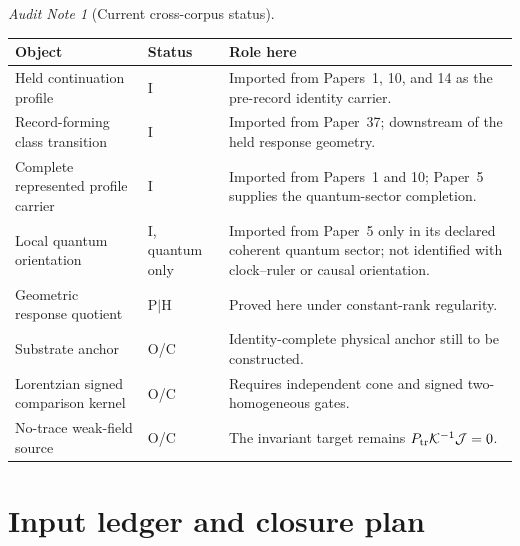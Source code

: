 \documentclass[11pt]{article}
\theoremstyle{remark}
\newtheorem{audit}[theorem]{Audit Note}
\newcommand{\Ptr}{P_{\rm tr}}
\begin{document}
\begin{audit}[Current cross-corpus status]
\begin{longtable}{p{}p{}p{}}
\toprule
Object & Status & Role here \\
\midrule
Held continuation profile & I & Imported from Papers~1, 10, and 14 as the pre-record identity carrier. \\
Record-forming class transition & I & Imported from Paper~37; downstream of the held response geometry. \\
Complete represented profile carrier & I & Imported from Papers~1 and 10; Paper~5 supplies the quantum-sector completion. \\
Local quantum orientation & I, quantum only & Imported from Paper~5 only in its declared coherent quantum sector; not identified with clock--ruler or causal orientation. \\
Geometric response quotient & P$\mid$H & Proved here under constant-rank regularity. \\
Substrate anchor & O/C & Identity-complete physical anchor still to be constructed. \\
Lorentzian signed comparison kernel & O/C & Requires independent cone and signed two-homogeneous gates. \\
No-trace weak-field source & O/C & The invariant target remains $\Ptr\mathcal K^{-1}\mathcal J=0$. \\
\bottomrule
\end{longtable}
\end{audit}

\section{Input ledger and closure plan}
\end{document}
